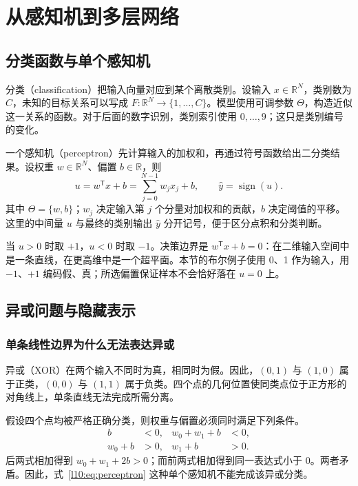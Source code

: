 \section{从感知机到多层网络}
\subsection{分类函数与单个感知机}

分类（classification）把输入向量对应到某个离散类别。设输入 $x\in\mathbb{R}^N$，类别数为 $C$，未知的目标关系可以写成 $F:\mathbb{R}^N\to\{1,\ldots,C\}$。模型使用可调参数 $\Theta$，构造近似这一关系的函数。对于后面的数字识别，类别索引使用 $0,\ldots,9$；这只是类别编号的变化。

一个感知机（perceptron）先计算输入的加权和，再通过符号函数给出二分类结果。设权重 $w\in\mathbb{R}^N$、偏置 $b\in\mathbb{R}$，则
\begin{equation}
 u=w^{\mathsf T}x+b=\sum_{j=0}^{N-1}w_jx_j+b,
 \qquad \widehat y=\operatorname{sign}(u).
 \label{l10:eq:perceptron}
\end{equation}
其中 $\Theta=\{w,b\}$；$w_j$ 决定输入第 $j$ 个分量对加权和的贡献，$b$ 决定阈值的平移。这里的中间量 $u$ 与最终的类别输出 $\widehat y$ 分开记号，便于区分点积和分类判断。

当 $u>0$ 时取 $+1$，$u<0$ 时取 $-1$。决策边界是 $w^{\mathsf T}x+b=0$：在二维输入空间中是一条直线，在更高维中是一个超平面。本节的布尔例子使用 0、1 作为输入，用 $-1$、$+1$ 编码假、真；所选偏置保证样本不会恰好落在 $u=0$ 上。

\subsection{异或问题与隐藏表示}

\subsubsection{单条线性边界为什么无法表达异或}
异或（XOR）在两个输入不同时为真，相同时为假。因此，$(0,1)$ 与 $(1,0)$ 属于正类，$(0,0)$ 与 $(1,1)$ 属于负类。四个点的几何位置使同类点位于正方形的对角线上，单条直线无法完成所需分离。

假设四个点均被严格正确分类，则权重与偏置必须同时满足下列条件。
\begin{align}
 b&<0,& w_0+w_1+b&<0,\\
 w_0+b&>0,&w_1+b&>0.
\end{align}
后两式相加得到 $w_0+w_1+2b>0$；而前两式相加得到同一表达式小于 0。两者矛盾。因此，式~\eqref{l10:eq:perceptron} 这种单个感知机不能完成该异或分类。

